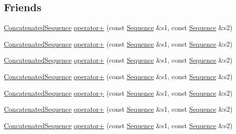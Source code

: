 \subsection*{Friends}
\begin{DoxyCompactItemize}
\item 
\mbox{\hyperlink{classfakeit_1_1ConcatenatedSequence}{Concatenated\+Sequence}} \mbox{\hyperlink{classfakeit_1_1ConcatenatedSequence_adb09b1b1e32428d0c2f46bd549141cdd}{operator+}} (const \mbox{\hyperlink{classfakeit_1_1Sequence}{Sequence}} \&s1, const \mbox{\hyperlink{classfakeit_1_1Sequence}{Sequence}} \&s2)
\item 
\mbox{\hyperlink{classfakeit_1_1ConcatenatedSequence}{Concatenated\+Sequence}} \mbox{\hyperlink{classfakeit_1_1ConcatenatedSequence_adb09b1b1e32428d0c2f46bd549141cdd}{operator+}} (const \mbox{\hyperlink{classfakeit_1_1Sequence}{Sequence}} \&s1, const \mbox{\hyperlink{classfakeit_1_1Sequence}{Sequence}} \&s2)
\item 
\mbox{\hyperlink{classfakeit_1_1ConcatenatedSequence}{Concatenated\+Sequence}} \mbox{\hyperlink{classfakeit_1_1ConcatenatedSequence_adb09b1b1e32428d0c2f46bd549141cdd}{operator+}} (const \mbox{\hyperlink{classfakeit_1_1Sequence}{Sequence}} \&s1, const \mbox{\hyperlink{classfakeit_1_1Sequence}{Sequence}} \&s2)
\item 
\mbox{\hyperlink{classfakeit_1_1ConcatenatedSequence}{Concatenated\+Sequence}} \mbox{\hyperlink{classfakeit_1_1ConcatenatedSequence_adb09b1b1e32428d0c2f46bd549141cdd}{operator+}} (const \mbox{\hyperlink{classfakeit_1_1Sequence}{Sequence}} \&s1, const \mbox{\hyperlink{classfakeit_1_1Sequence}{Sequence}} \&s2)
\item 
\mbox{\hyperlink{classfakeit_1_1ConcatenatedSequence}{Concatenated\+Sequence}} \mbox{\hyperlink{classfakeit_1_1ConcatenatedSequence_adb09b1b1e32428d0c2f46bd549141cdd}{operator+}} (const \mbox{\hyperlink{classfakeit_1_1Sequence}{Sequence}} \&s1, const \mbox{\hyperlink{classfakeit_1_1Sequence}{Sequence}} \&s2)
\item 
\mbox{\hyperlink{classfakeit_1_1ConcatenatedSequence}{Concatenated\+Sequence}} \mbox{\hyperlink{classfakeit_1_1ConcatenatedSequence_adb09b1b1e32428d0c2f46bd549141cdd}{operator+}} (const \mbox{\hyperlink{classfakeit_1_1Sequence}{Sequence}} \&s1, const \mbox{\hyperlink{classfakeit_1_1Sequence}{Sequence}} \&s2)
\item 
\mbox{\hyperlink{classfakeit_1_1ConcatenatedSequence}{Concatenated\+Sequence}} \mbox{\hyperlink{classfakeit_1_1ConcatenatedSequence_adb09b1b1e32428d0c2f46bd549141cdd}{operator+}} (const \mbox{\hyperlink{classfakeit_1_1Sequence}{Sequence}} \&s1, const \mbox{\hyperlink{classfakeit_1_1Sequence}{Sequence}} \&s2)

\end{DoxyCompactItemize}
